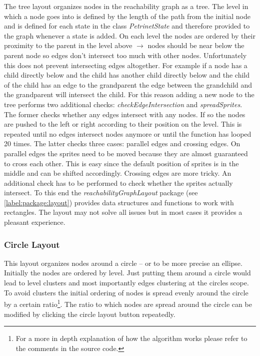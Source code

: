 \documentclass[10pt, a4paper]{article}
\begin{document}
The tree layout organizes nodes in the reachability graph as a tree. The level in which a node goes into is defined by the length of the path from the initial node and is defined for each state in the class \textit{PetrinetState} and therefore provided to the graph whenever a state is added. On each level the nodes are ordered by their proximity to the parent in the level above $\rightarrow$ nodes should be near below the parent node so edges don't intersect too much with other nodes. Unfortunately this does not prevent intersecting edges altogether. For example if a node has a child directly below and the child has another child directly below and the child of the child has an edge to the grandparent the edge between the grandchild and the grandparent will intersect the child. For this reason adding a new node to the tree performs two additional checks: \textit{checkEdgeIntersection} and \textit{spreadSprites}. The former checks whether any edges intersect with any nodes. If so the nodes are pushed to the left or right according to their position on the level. This is repeated until no edges intersect nodes anymore or until the function has looped 20 times. The latter checks three cases: parallel edges and crossing edges. On parallel edges the sprites need to be moved because they are almost guaranteed to cross each other. This is easy since the default position of sprites is in the middle and can be shifted accordingly. Crossing edges are more tricky. An additional check has to be performed to check whether the sprites actually intersect. To this end the \textit{reachabilityGraphLayout} package (see \ref{label:package:layout}) provides data structures and functions to work with rectangles. The layout may not solve all issues but in most cases it provides a pleasant experience.

\subsubsection{Circle Layout}
\label{label:circleLayout}

This layout organizes nodes around a circle -- or to be more precise an ellipse. Initially the nodes are ordered by level. Just putting them around a circle would lead to level clusters and most importantly edges clustering at the circles scope. To avoid clusters the initial ordering of nodes is spread evenly around the circle by a certain ratio\footnote{For a more in depth explanation of how the algorithm works please refer to the comments in the source code.}. The ratio to which nodes are spread around the circle can be modified by clicking the circle layout button repeatedly.
\end{document}
